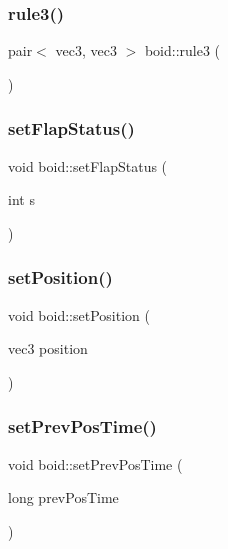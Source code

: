 \subsubsection{\texorpdfstring{rule3()}{rule3()}}
{\footnotesize\ttfamily pair$<$ vec3, vec3 $>$ boid\+::rule3 (\begin{DoxyParamCaption}{ }\end{DoxyParamCaption})}

\mbox{\label{classboid_a9dd824da8b99de54ad8956a9d1f2ca1c}} 
\subsubsection{\texorpdfstring{set\+Flap\+Status()}{setFlapStatus()}}
{\footnotesize\ttfamily void boid\+::set\+Flap\+Status (\begin{DoxyParamCaption}\item[{int}]{s }\end{DoxyParamCaption})}

\mbox{\label{classboid_acb8f49d32e4a39327f990914b2520f11}} 
\subsubsection{\texorpdfstring{set\+Position()}{setPosition()}}
{\footnotesize\ttfamily void boid\+::set\+Position (\begin{DoxyParamCaption}\item[{vec3}]{position }\end{DoxyParamCaption})}

\mbox{\label{classboid_a93dc299e67fc16129a99ef712b2e2e85}} 
\subsubsection{\texorpdfstring{set\+Prev\+Pos\+Time()}{setPrevPosTime()}}
{\footnotesize\ttfamily void boid\+::set\+Prev\+Pos\+Time (\begin{DoxyParamCaption}\item[{long}]{prev\+Pos\+Time }\end{DoxyParamCaption})}

